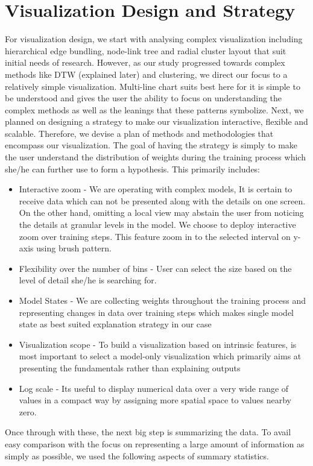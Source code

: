 \documentclass[journal]{vgtc}                %
\begin{document}
\section{Visualization Design and Strategy  }
For visualization design, we start with analysing complex visualization
including hierarchical edge bundling, node-link tree and radial cluster layout
that suit initial needs of research. However, as our study progressed
towards complex methods like DTW (explained later) and clustering, we direct our focus to
a relatively simple visualization.
Multi-line chart suits best here for it is simple to be understood and gives the user the ability to focus on understanding the complex methods as well as the leanings that these patterns symbolize.  
Next, we planned on designing a strategy to make our visualization interactive, flexible and scalable. Therefore, we devise a plan of methods and methodologies that encompass our visualization. The goal of having the strategy is simply to make the user understand the distribution of weights during the training process which she/he can further use to form a hypothesis. This primarily includes: 
\begin{itemize}
\item Interactive zoom - We are operating with complex models, It is certain to receive data which can not be presented along with the details on one screen. On the other hand, omitting a local view may abstain the user from noticing the details at granular levels in the model. We choose to deploy interactive zoom over training steps. This feature zoom in to the selected interval on y-axis using brush pattern. 
\item Flexibility over the number of bins - User can select the size based on the level of detail she/he is searching for.
\item Model States - We are collecting weights throughout the training process and representing changes in data over training steps which makes single model state as best suited explanation strategy in our case 
\item Visualization scope - To build a visualization based on intrinsic features, is most important to select a model-only visualization which primarily aims at presenting the fundamentals rather than explaining outputs  \cite{verbalization}
\item Log scale - Its useful to display numerical data over a very wide range of values in a compact way by assigning more spatial space to values nearby zero.
\end{itemize}
Once through with these, the next big step is summarizing the data. 
To avail easy comparison with the focus on representing a large amount of information as simply as possible, we used the following aspects of summary statistics.
\end{document}
